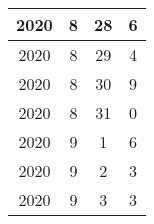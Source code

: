 \begin{longtable} {|c|c|c|c|}
\hline
2020         & 8            & 28           & 6                         \\ 
\hline
2020         & 8            & 29           & 4                         \\ 
\hline
2020         & 8            & 30           & 9                         \\ 
\hline
2020         & 8            & 31           & 0                         \\ 
\hline
2020         & 9            & 1            & 6                         \\ 
\hline
2020         & 9            & 2            & 3                         \\ 
\hline
2020         & 9            & 3            & 3                         \\
\hline
\end{longtable}




%
%



